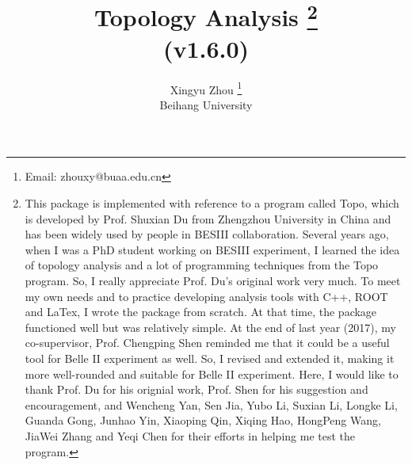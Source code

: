 \documentclass[landscape]{article}
\begin{document}
\title{Topology Analysis \footnote{\normalsize{This package is implemented with reference to a program called {\sc Topo}, which is developed by Prof. Shuxian Du from Zhengzhou University in China and has been widely used by people in BESIII collaboration. Several years ago, when I was a PhD student working on BESIII experiment, I learned the idea of topology analysis and a lot of programming techniques from the {\sc Topo} program. So, I really appreciate Prof. Du's original work very much. To meet my own needs and to practice developing analysis tools with C++, ROOT and LaTex, I wrote the package from scratch. At that time, the package functioned well but was relatively simple. At the end of last year (2017), my co-supervisor, Prof. Chengping Shen reminded me that it could be a useful tool for Belle II experiment as well. So, I revised and extended it, making it more well-rounded and suitable for Belle II experiment. Here, I would like to thank Prof. Du for his orignial work, Prof. Shen for his suggestion and encouragement, and Wencheng Yan, Sen Jia, Yubo Li, Suxian Li, Longke Li, Guanda Gong, Junhao Yin, Xiaoping Qin, Xiqing Hao, HongPeng Wang, JiaWei Zhang and Yeqi Chen for their efforts in helping me test the program.}} \\ \vspace{0.1cm} \Large{(v1.6.0)}}
\author{Xingyu Zhou \footnote{\normalsize{Email: zhouxy@buaa.edu.cn}} \\ \vspace{0.1cm} Beihang University}
\maketitle

\clearpage


\listoftables


\clearpage
\end{document}
